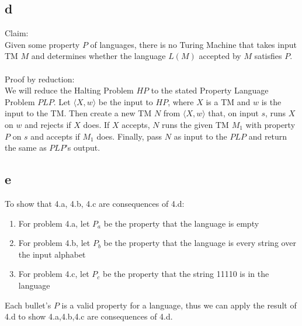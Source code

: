 \documentclass[letterpaper,notitlepage,twoside]{article}
\begin{document}
\subsection*{d}
Claim:\\
Given some property $P$ of languages, there is no Turing Machine that takes input TM $M$ and determines whether the language $L(M)$ accepted by $M$ satisfies $P$.\\\\
Proof by reduction:\\
We will reduce the Halting Problem $HP$ to the stated Property Language Problem $PLP$. Let $\langle X, w \rangle$ be the input to $HP$, where $X$ is a TM and $w$ is the input to the TM. Then create a new TM $N$ from $\langle X, w \rangle$ that, on input $s$, runs $X$ on $w$ and rejects if $X$ does. If $X$ accepts, $N$ runs the given TM $M_1$ with property $P$ on $s$ and accepts if $M_1$ does. Finally, pass $N$ as input to the $PLP$ and return the same as $PLP$'s output.

\subsection*{e}
To show that 4.a, 4.b, 4.c are consequences of 4.d:
\begin{enumerate}
\item For problem 4.a, let $P_a$ be the property that the language is empty
\item For problem 4.b, let $P_b$ be the property that the language is every string over the input alphabet
\item For problem 4.c, let $P_c$ be the property that the string 11110 is in the language
\end{enumerate}
Each bullet's $P$ is a valid property for a language, thus we can apply the result of 4.d to show 4.a,4.b,4.c are consequences of 4.d.
\end{document}
